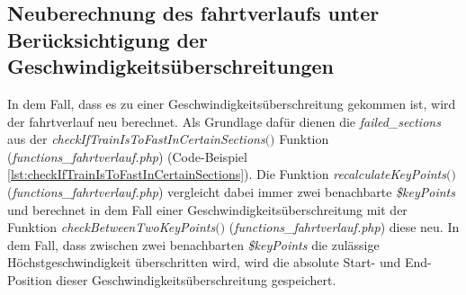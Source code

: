 \subsection{Neuberechnung des \Gls{fahrtverlauf}s unter Berücksichtigung der\\Ge\-schwin\-dig\-keits\-über\-schrei\-tun\-gen} \label{neuberechnung}
In dem Fall, dass es zu einer Geschwindigkeitsüberschreitung gekommen ist, wird der \Gls{fahrtverlauf} neu berechnet. Als Grundlage dafür dienen die \textit{failed\_sections} aus der \textit{check\-If\-Train\-Is\-To\-Fast\-In\-Certain\-Sections$($$)$} Funktion (\textit{functions\_fahrtverlauf.php}) (Code-Beispiel \ref{lst:checkIfTrainIsToFastInCertainSections}). Die Funktion \textit{recalculate\-Key\-Points$($$)$} (\textit{functions\_fahrtverlauf.php}) vergleicht dabei immer zwei benachbarte \textit{\$keyPoints} und berechnet in dem Fall einer Geschwindigkeitsüberschreitung mit der Funktion \textit{check\-Between\-Two\-Key\-Points$($$)$} (\textit{func\-tions\_\linebreak[4]fahrt\-ver\-lauf\-.php}) diese neu. In dem Fall, dass zwischen zwei benachbarten \textit{\$key\-Points} die zulässige Höchst\-ge\-schwin\-dig\-keit überschritten wird, wird die absolute Start- und End-Position dieser Ge\-schwin\-digkeits\-über\-schrei\-tung gespeichert. 

